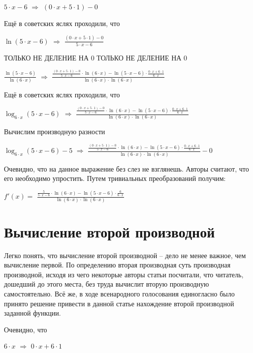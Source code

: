 \documentclass{article}
\begin{document}
$5 \cdot x - 6$ $\Rightarrow$ $(0 \cdot x + 5 \cdot 1) - 0$

Ещё в советских яслях проходили, что

$ \ln (5 \cdot x - 6)$ $\Rightarrow$ $\frac{(0 \cdot x + 5 \cdot 1) - 0}{5 \cdot x - 6}$

ТОЛЬКО НЕ ДЕЛЕНИЕ НА 0 ТОЛЬКО НЕ ДЕЛЕНИЕ НА 0

$\frac{ \ln (5 \cdot x - 6)}{ \ln (6 \cdot x)}$ $\Rightarrow$ $\frac{\frac{(0 \cdot x + 5 \cdot 1) - 0}{5 \cdot x - 6} \cdot  \ln (6 \cdot x) -  \ln (5 \cdot x - 6) \cdot \frac{0 \cdot x + 6 \cdot 1}{6 \cdot x}}{ \ln (6 \cdot x) \cdot  \ln (6 \cdot x)}$

Ещё в советских яслях проходили, что

$\log_{6 \cdot x}(5 \cdot x - 6)$ $\Rightarrow$ $\frac{\frac{(0 \cdot x + 5 \cdot 1) - 0}{5 \cdot x - 6} \cdot  \ln (6 \cdot x) -  \ln (5 \cdot x - 6) \cdot \frac{0 \cdot x + 6 \cdot 1}{6 \cdot x}}{ \ln (6 \cdot x) \cdot  \ln (6 \cdot x)}$

Вычислим производную разности

$\log_{6 \cdot x}(5 \cdot x - 6) - 5$ $\Rightarrow$ $\frac{\frac{(0 \cdot x + 5 \cdot 1) - 0}{5 \cdot x - 6} \cdot  \ln (6 \cdot x) -  \ln (5 \cdot x - 6) \cdot \frac{0 \cdot x + 6 \cdot 1}{6 \cdot x}}{ \ln (6 \cdot x) \cdot  \ln (6 \cdot x)} - 0$

Очевидно, что на данное выражение без слез не взглянешь. Авторы считают, что его необходимо упростить. Путем тривиальных преобразований получим:

$f'(x) = $ $\frac{\frac{5}{5 \cdot x - 6} \cdot  \ln (6 \cdot x) -  \ln (5 \cdot x - 6) \cdot \frac{6}{6 \cdot x}}{ \ln (6 \cdot x) \cdot  \ln (6 \cdot x)}$\section{Вычисление второй производной}

Легко понять, что вычисление второй производной -- дело не менее важное, чем вычисление первой. По определению вторая производная суть производная производной, исходя из чего некоторые авторы статьи посчитали, что читатель, дошедший до этого места, без труда вычислит вторую производную самостоятельно. Всё же, в ходе всенародного голосования единогласно было принято решение привести в данной статье нахождение второй производной заданной функции.

Очевидно, что

$6 \cdot x$ $\Rightarrow$ $0 \cdot x + 6 \cdot 1$
\end{document}
